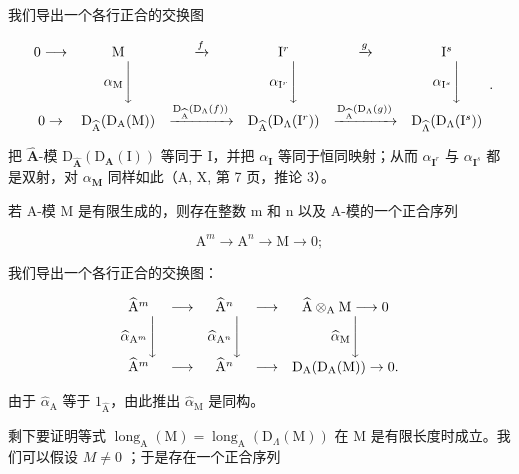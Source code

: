 我们导出一个各行正合的交换图

\[
\begin{array}{c c c c c c} 0 \longrightarrow & \mathrm{M} & \xrightarrow {f} & \mathrm{I} ^ {r} & \xrightarrow {g} & \mathrm{I} ^ {s} \\ & \alpha_ {\mathrm{M}} \Biggl \downarrow & & \alpha_ {\mathrm{I} ^ {r}} \Biggl \downarrow & & \alpha_ {\mathrm{I} ^ {s}} \Biggl \downarrow \\ 0 \to & \mathrm{D} _ {\widehat {\mathrm{A}}} (\mathrm{D} _ {\mathrm{A}} (\mathrm{M})) & \xrightarrow {\mathrm{D} _ {\widehat {\mathrm{A}}} (\mathrm{D} _ {\Lambda} (f))} & \mathrm{D} _ {\widehat {\mathrm{A}}} (\mathrm{D} _ {\Lambda} (\mathrm{I} ^ {r})) & \xrightarrow {\mathrm{D} _ {\widehat {\mathrm{A}}} (\mathrm{D} _ {\Lambda} (g))} & \mathrm{D} _ {\widehat {\Lambda}} (\mathrm{D} _ {\Lambda} (\mathrm{I} ^ {s})) \end{array} .
\]

把 \(\widehat{\mathbf{A}}\)-模 \(\mathrm{D}_{\widehat{\mathbf{A}}}(\mathrm{D}_{\mathbf{A}}(\mathrm{I}))\) 等同于 I，并把 \(\alpha_{\mathbf{I}}\) 等同于恒同映射；从而 \(\alpha_{\mathbf{I}^r}\) 与 \(\alpha_{\mathbf{I}^s}\) 都是双射，对 \(\alpha_{\mathbf{M}}\) 同样如此（A, X, 第 7 页，推论 3）。

若 A-模 M 是有限生成的，则存在整数 m 和 n 以及 A-模的一个正合序列

\[
\mathrm{A} ^ {m} \longrightarrow \mathrm{A} ^ {n} \longrightarrow \mathrm{M} \rightarrow 0;
\]

我们导出一个各行正合的交换图：

\[
\begin{array}{c c c c c} \widehat {\mathrm{A}} ^ {m} & \longrightarrow & \widehat {\mathrm{A}} ^ {n} & \longrightarrow & \widehat {\mathrm{A}} \otimes_ {\mathrm{A}} \mathrm{M} \longrightarrow 0 \\ \widehat {\alpha} _ {\mathrm{A} ^ {m}} \Bigg \downarrow & & \widehat {\alpha} _ {\mathrm{A} ^ {n}} \Bigg \downarrow & & \widehat {\alpha} _ {\mathrm{M}} \Bigg \downarrow \\ \widehat {\mathrm{A}} ^ {m} & \longrightarrow & \widehat {\mathrm{A}} ^ {n} & \longrightarrow & \mathrm{D} _ {\mathrm{A}} (\mathrm{D} _ {\mathrm{A}} (\mathrm{M})) \to 0. \end{array}
\]

由于 \(\widehat{\alpha}_{\mathrm{A}}\) 等于 \(1_{\widehat{\mathrm{A}}}\)，由此推出 \(\widehat{\alpha}_{\mathrm{M}}\) 是同构。

剩下要证明等式 \(\operatorname{long}_{\mathrm{A}}(\mathrm{M}) = \operatorname{long}_{\mathrm{A}}(\mathrm{D}_{\Lambda}(\mathrm{M}))\) 在 M 是有限长度时成立。我们可以假设 \(M \neq 0\) ；于是存在一个正合序列

